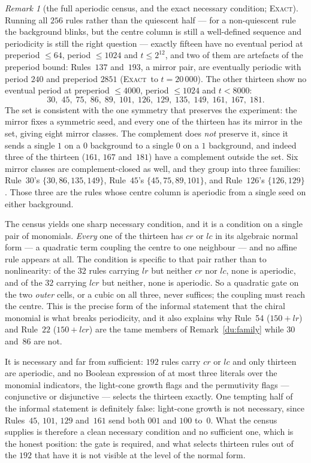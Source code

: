 \documentclass[11pt]{article}
\theoremstyle{definition}
\theoremstyle{remark}
\newtheorem{remark}[theorem]{Remark}
\newcommand{\EXACT}{\textsc{Exact}}
\begin{document}
\begin{remark}[the full aperiodic census, and the exact necessary condition; \EXACT]\label{du:gate}
Running all $256$ rules rather than the quiescent half --- for a non-quiescent rule the background
blinks, but the centre column is still a well-defined sequence and periodicity is still the right
question --- exactly fifteen have no eventual period at preperiod $\le64$, period $\le1024$ and
$t\le2^{12}$, and two of them are artefacts of the preperiod bound: Rules~$137$ and~$193$, a mirror pair,
are eventually periodic with period $240$ and preperiod $2851$ (\EXACT\ to $t=20\,000$). The other
thirteen show no eventual period at preperiod $\le4000$, period $\le1024$ and $t<8000$:
\[
30,\;45,\;75,\;86,\;89,\;101,\;126,\;129,\;135,\;149,\;161,\;167,\;181 .
\]
The set is consistent with the one symmetry that preserves the experiment: the mirror fixes a symmetric
seed, and every one of the thirteen has its mirror in the set, giving eight mirror classes. The complement
does \emph{not} preserve it, since it sends a single $1$ on a $0$ background to a single $0$ on a $1$
background, and indeed three of the thirteen ($161$, $167$ and~$181$) have a complement outside the set.
Six mirror classes are
complement-closed as well, and they group into three families: Rule~$30$'s $\{30,86,135,149\}$,
Rule~$45$'s $\{45,75,89,101\}$, and Rule~$126$'s $\{126,129\}$. Those three are the rules whose centre
column is aperiodic from a single seed on either background.

The census yields one sharp necessary condition, and it is a condition on a single pair of monomials.
\emph{Every} one of the thirteen has $cr$ or $lc$ in its algebraic normal form --- a quadratic term
coupling the centre to one neighbour --- and no affine rule appears at all. The condition is specific to
that pair rather than to nonlinearity: of the $32$ rules carrying $lr$ but neither $cr$ nor $lc$, none is
aperiodic, and of the $32$ carrying $lcr$ but neither, none is aperiodic. So a quadratic gate on the two
\emph{outer} cells, or a cubic on all three, never suffices; the coupling must reach the centre. This is
the precise form of the informal statement that the chiral monomial is what breaks periodicity, and it
also explains why Rule~54 ($150+lr$) and Rule~$22$ ($150+lcr$) are the tame members of
Remark~\ref{du:family} while $30$ and~$86$ are not.

It is necessary and far from sufficient: $192$ rules carry $cr$ or $lc$ and only thirteen are aperiodic,
and no Boolean expression of at most three literals over the monomial indicators, the light-cone growth
flags and the permutivity flags --- conjunctive or disjunctive --- selects the thirteen exactly. One
tempting half of the informal statement is definitely false: light-cone growth is not necessary, since
Rules~$45$, $101$, $129$ and~$161$ send both $001$ and $100$ to~$0$. What the census
supplies is therefore a clean necessary condition and no sufficient one, which is the honest position:
the gate is required, and what selects thirteen rules out of the $192$ that have it is not visible at the
level of the normal form.
\end{remark}
\end{document}
